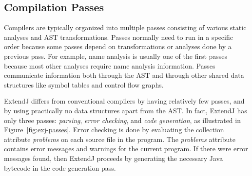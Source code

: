 \documentclass[10pt, twoside, openright]{book}
\newcommand{\figref}[1]{Figure~\ref{#1}}
\begin{document}




\subsection{Compilation Passes}


Compilers are typically organized into multiple passes consisting of various
static analyses and AST transformations.
Passes normally need to run in a specific order because some passes depend on transformations
or analyses done by a previous pass. For example, name analysis is usually one of the
first passes because most other analyses require name analysis information.
Passes communicate information both through the AST and through other shared data structures
like symbol tables and control flow graphs.

ExtendJ differs from conventional compilers by having relatively few passes,
and by using practically no data structures apart from the AST.
In fact, ExtendJ has only three passes:
\emph{parsing}, \emph{error checking}, and \emph{code generation}, as illustrated in
\figref{fig:exj-passes}.
Error checking is done by evaluating
the collection attribute \emph{problems} on each source file in the program. The
\emph{problems} attribute contains error messages and warnings for the current program.
If there were error messages found, then ExtendJ proceeds by generating the necessary Java bytecode
in the code generation pass.
\end{document}
